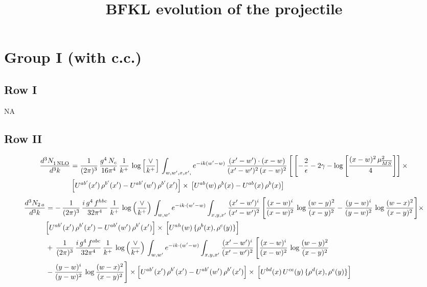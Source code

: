 \documentclass[9pt]{article}
\title{BFKL evolution of the projectile\\[2pt] \large \new{(corrected: red = remove, blue = add)}}
\author{}
\date{}
\numberwithin{equation}{section}
\begin{document}
\maketitle
\section{Group I (with c.c.)}
\subsection{Row I}
\textsc{NA}
\subsection{Row II}
\begin{align}
     \frac{d^{3}N_{1\,\rm NLO}^{\rm}}{d^{3}k} &  = \frac{1}{(2\pi)^{3}}\, \frac{g^{4}\,N_{c}}{16\pi^{4}}\,\frac{1}{k^{+}}\,\log{\left[\frac{\vee}{k^{+}}\right]}\, \int_{w, w',x,x',} e^{-ik(w^\prime-w)}\, \frac{(x'-w')\cdot (x-w)}{(x'-w')^{2}\, (x-w)^{2}}\, \Bigg[\left[-\frac{2}{\epsilon}-2\gamma-\log{\left[\frac{(x-w)^{2}\,\mu^{2}_{\overline{MS}}}{4}\right]}\right]\times\notag \\ &  \left[U^{ab'}(x')\,\rho^{b'}(x') - U^{ab'}(w')\,\rho^{b'}(x')\right]\times\,\left[U^{ab}(w)\,\rho^{b}(x) - U^{ab}(x)\,\rho^{b}(x)\right]
\end{align}
\begin{align}
    \frac{d^{3}N_{2\,a}}{d^{3}k} & =  -\,\frac{1}{(2\pi)^{3}}\,\frac{i\,g^{4}\,f^{hbc}}{32\pi^{4}}\,\frac{1}{k^{+}}\,\log\left(\frac{\vee}{k^{+}}\right)\,
\int_{w,w'} e^{-ik\cdot(w'-w)}\int_{x,y,x'}\frac{(x'-w')^{i}}{(x'-w')^{2}}\,\Bigg[\frac{(x-w)^{i}}{(x-w)^{2}}\,\log\frac{(w-y)^{2}}{(x-y)^{2}}-\frac{(y-w)^{i}}{(y-w)^{2}}\,\log\frac{(w-x)^{2}}{(x-y)^{2}}\Bigg]\times\notag \\ & \Big[U^{ab'}(x')\,\rho^{b'}(x')-U^{ab'}(w')\,\rho^{b'}(x')\Big]\times\, \Big[U^{ah}(w)\,\{\rho^{b}(x),\rho^{c}(y)\}\Big]\notag \\ & +\,\frac{1}{(2\pi)^{3}}\,\frac{i\,g^{4}\,f^{abc}}{32\pi^{4}}\,\frac{1}{k^{+}}\, \log\left(\frac{\vee}{k^{+}}\right)\,
\int_{w,w'} e^{-ik\cdot(w'-w)}\int_{x,y,x'}\frac{(x'-w')^{i}}{(x'-w')^{2}}\,\Bigg[\frac{(x-w)^{i}}{(x-w)^{2}}\,\log\frac{(w-y)^{2}}{(x-y)^{2}}\notag \\ & -\frac{(y-w)^{i}}{(y-w)^{2}}\,\log\frac{(w-x)^{2}}{(x-y)^{2}}\Bigg]\times \Big[U^{ab'}(x')\,\rho^{b'}(x')-U^{ab'}(w')\,\rho^{b'}(x')\Big]\times\, \Big[U^{bd}(x)\,U^{ce}(y)\,\{\rho^{d}(x),\rho^{e}(y)\}\Big]
\end{align}
\end{document}
